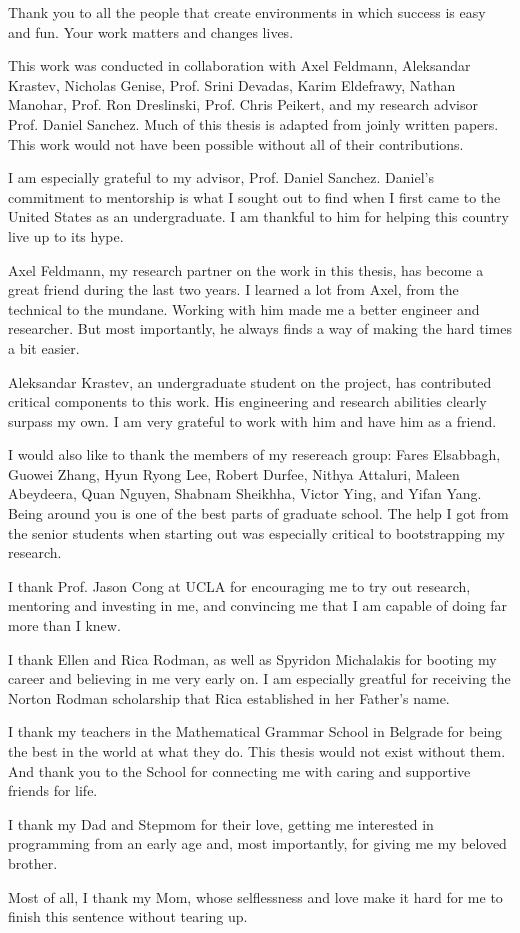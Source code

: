 Thank you to all the people that create environments in which success is easy
and fun. Your work matters and changes lives.

This work was conducted in collaboration with Axel Feldmann, Aleksandar
Krastev, Nicholas Genise, Prof. Srini Devadas, Karim Eldefrawy, Nathan Manohar,
Prof. Ron Dreslinski, Prof. Chris Peikert, and my research advisor Prof. Daniel
Sanchez. Much of this thesis is adapted from joinly written papers. This work
would not have been possible without all of their contributions.

I am especially grateful to my advisor, Prof. Daniel Sanchez. Daniel's
commitment to mentorship is what I sought out to find when I first came to the
United States as an undergraduate. I am thankful to him for helping this
country live up to its hype.

Axel Feldmann, my research partner on the work in this thesis, has become a
great friend during the last two years. I learned a lot from Axel, from the
technical to the mundane. Working with him made me a better engineer and
researcher. But most importantly, he always finds a way of making the hard
times a bit easier.

Aleksandar Krastev, an undergraduate student on the project, has contributed
critical components to this work. His engineering and research abilities
clearly surpass my own. I am very grateful to work with him and have him as a
friend.

I would also like to thank the members of my resereach group: Fares Elsabbagh,
Guowei Zhang, Hyun Ryong Lee, Robert Durfee, Nithya Attaluri, Maleen Abeydeera,
Quan Nguyen, Shabnam Sheikhha, Victor Ying, and Yifan Yang. Being around you is
one of the best parts of graduate school. The help I got from the senior
students when starting out was especially critical to bootstrapping my
research.

I thank Prof. Jason Cong at UCLA for encouraging me to try out research,
mentoring and investing in me, and convincing me that I am capable of doing far
more than I knew.

I thank Ellen and Rica Rodman, as well as Spyridon Michalakis for booting my
career and believing in me very early on. I am especially greatful for
receiving the Norton Rodman scholarship that Rica established in her Father's
name.

I thank my teachers in the Mathematical Grammar School in Belgrade for being
the best in the world at what they do. This thesis would not exist without
them. And thank you to the School for connecting me with caring and supportive
friends for life.

I thank my Dad and Stepmom for their love, getting me interested in programming
from an early age and, most importantly, for giving me my beloved brother.

Most of all, I thank my Mom, whose selflessness and love make it hard for me to
finish this sentence without tearing up.

